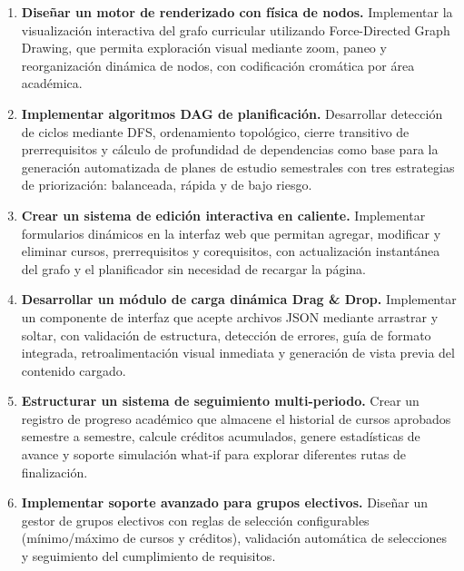 \documentclass[12pt]{report}
\begin{document}
\begin{enumerate}[label=\alph*)]

    \item \textbf{Diseñar un motor de renderizado con física de nodos.} Implementar la visualización interactiva del grafo curricular utilizando Force-Directed Graph Drawing, que permita exploración visual mediante zoom, paneo y reorganización dinámica de nodos, con codificación cromática por área académica.

    \item \textbf{Implementar algoritmos DAG de planificación.} Desarrollar detección de ciclos mediante DFS, ordenamiento topológico, cierre transitivo de prerrequisitos y cálculo de profundidad de dependencias como base para la generación automatizada de planes de estudio semestrales con tres estrategias de priorización: balanceada, rápida y de bajo riesgo.

    \item \textbf{Crear un sistema de edición interactiva en caliente.} Implementar formularios dinámicos en la interfaz web que permitan agregar, modificar y eliminar cursos, prerrequisitos y corequisitos, con actualización instantánea del grafo y el planificador sin necesidad de recargar la página.

    \item \textbf{Desarrollar un módulo de carga dinámica Drag \& Drop.} Implementar un componente de interfaz que acepte archivos JSON mediante arrastrar y soltar, con validación de estructura, detección de errores, guía de formato integrada, retroalimentación visual inmediata y generación de vista previa del contenido cargado.

    \item \textbf{Estructurar un sistema de seguimiento multi-periodo.} Crear un registro de progreso académico que almacene el historial de cursos aprobados semestre a semestre, calcule créditos acumulados, genere estadísticas de avance y soporte simulación what-if para explorar diferentes rutas de finalización.

    \item \textbf{Implementar soporte avanzado para grupos electivos.} Diseñar un gestor de grupos electivos con reglas de selección configurables (mínimo/máximo de cursos y créditos), validación automática de selecciones y seguimiento del cumplimiento de requisitos.

\end{enumerate}

\end{document}
